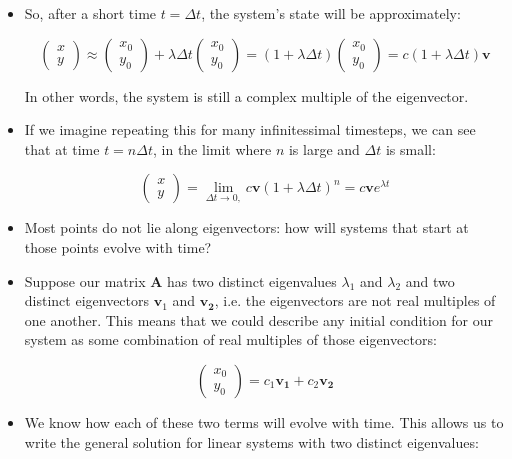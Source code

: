 \documentclass{article}
\begin{document}
\begin{itemize}
\item So, after a short time $t=\Delta t$, the system's state will be approximately:

\[ \begin{pmatrix} x\\y \end{pmatrix} \approx \begin{pmatrix} x_0\\y_0 \end{pmatrix}  + \lambda \Delta t \begin{pmatrix} x_0\\y_0 \end{pmatrix} = \left(1 + \lambda \Delta t  \right) \begin{pmatrix} x_0\\y_0 \end{pmatrix} = c  \left(1 + \lambda \Delta t  \right) \mathbf{v} \]

In other words, the system is still a complex multiple of the eigenvector.

\item If we imagine repeating this for many infinitessimal timesteps, we can see that at time $t = n \Delta t$, in the limit where $n$ is large and $\Delta t$ is small:

\[ \begin{pmatrix} x\\y \end{pmatrix} = \lim_{\Delta t \to 0,} c \mathbf{v} \left(1 + \lambda \Delta t \right)^n = c \mathbf{v} e^{\lambda t} \]

\item Most points do not lie along eigenvectors: how will systems that start at those points evolve with time?

\item Suppose our matrix $\mathbf{A}$ has two distinct eigenvalues $\lambda_1$ and $\lambda_2$ and two distinct eigenvectors $\mathbf{v}_1$ and $\mathbf{v_2}$, i.e. the eigenvectors are not real multiples of one another. This means that we could describe any initial condition for our system as some combination of real multiples of those eigenvectors:

\[ \begin{pmatrix} x_0\\y_0 \end{pmatrix} = c_1 \mathbf{v_1} + c_2 \mathbf{v_2} \]

\item We know how each of these two terms will evolve with time. This allows us to write the general solution for linear systems with two distinct eigenvalues:


\end{itemize}
\end{document}
